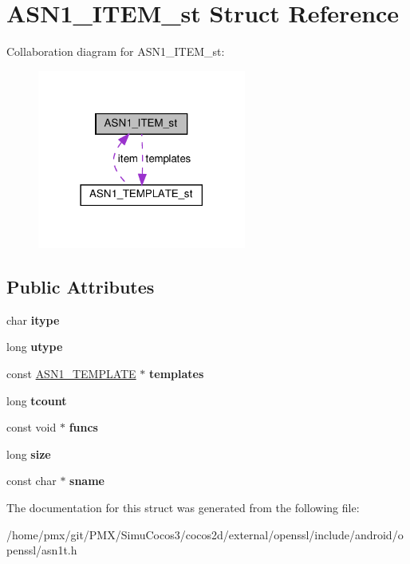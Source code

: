 \hypertarget{structASN1__ITEM__st}{}\section{A\+S\+N1\+\_\+\+I\+T\+E\+M\+\_\+st Struct Reference}
\label{structASN1__ITEM__st}


Collaboration diagram for A\+S\+N1\+\_\+\+I\+T\+E\+M\+\_\+st\+:
\nopagebreak
\begin{figure}[H]
\begin{center}
\leavevmode
\includegraphics[width=194pt]{structASN1__ITEM__st__coll__graph}
\end{center}
\end{figure}
\subsection*{Public Attributes}
\begin{DoxyCompactItemize}
\item 
\mbox{\label{structASN1__ITEM__st_a303cc31bacb86b92451cb5b389e57440}} 
char {\bfseries itype}
\item 
\mbox{\label{structASN1__ITEM__st_a49602e67011b80d23622751f6ce154f5}} 
long {\bfseries utype}
\item 
\mbox{\label{structASN1__ITEM__st_a262c20e666593726f5fae37cdb0eec03}} 
const \hyperlink{structASN1__TEMPLATE__st}{A\+S\+N1\+\_\+\+T\+E\+M\+P\+L\+A\+TE} $\ast$ {\bfseries templates}
\item 
\mbox{\label{structASN1__ITEM__st_a52bce8167464f68b77aeeabf7b8c26d9}} 
long {\bfseries tcount}
\item 
\mbox{\label{structASN1__ITEM__st_ae0c6c610b2f15abc921e44b1f8cf66d0}} 
const void $\ast$ {\bfseries funcs}
\item 
\mbox{\label{structASN1__ITEM__st_a5f11bb1968cd49b114d1459ecb9574d9}} 
long {\bfseries size}
\item 
\mbox{\label{structASN1__ITEM__st_a47537551ddc83255448a20d99fc71aaa}} 
const char $\ast$ {\bfseries sname}
\end{DoxyCompactItemize}


The documentation for this struct was generated from the following file\+:\begin{DoxyCompactItemize}
\item 
/home/pmx/git/\+P\+M\+X/\+Simu\+Cocos3/cocos2d/external/openssl/include/android/openssl/asn1t.\+h\end{DoxyCompactItemize}
